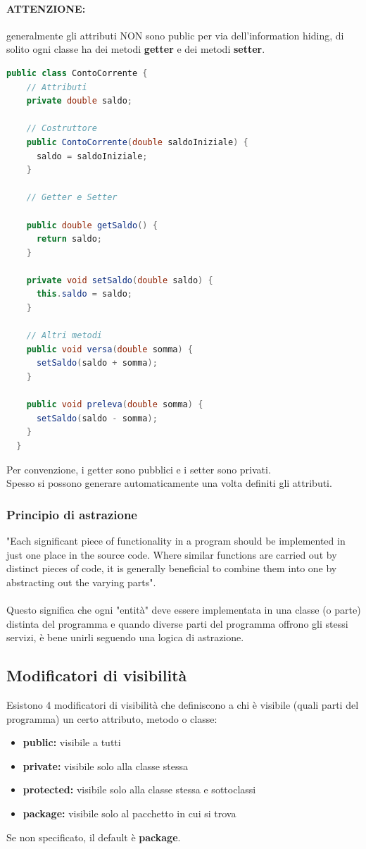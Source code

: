\documentclass[12pt,a4paper]{article}
\begin{document}
\paragraph{ATTENZIONE:} generalmente gli attributi NON sono public per via dell'information hiding, di solito ogni classe ha dei metodi \textbf{getter} e dei metodi \textbf{setter}.
\begin{lstlisting}[language=Java]
  public class ContoCorrente {
    // Attributi
    private double saldo;

    // Costruttore
    public ContoCorrente(double saldoIniziale) {
      saldo = saldoIniziale;
    }

    // Getter e Setter 

    public double getSaldo() {
      return saldo;
    }

    private void setSaldo(double saldo) {
      this.saldo = saldo;
    }

    // Altri metodi
    public void versa(double somma) {
      setSaldo(saldo + somma);
    }

    public void preleva(double somma) {
      setSaldo(saldo - somma);
    }
  }
\end{lstlisting}
Per convenzione, i getter sono pubblici e i setter sono privati.\\
Spesso si possono generare automaticamente una volta definiti gli attributi.
\subsubsection{Principio di astrazione} 
"Each significant piece of
functionality in a program should be implemented in just one
place in the source code. Where similar functions are carried
out by distinct pieces of code, it is generally beneficial to
combine them into one by abstracting out the varying parts".\\\\
Questo significa che ogni "entità" deve essere implementata in una classe (o parte) distinta del programma e quando diverse parti del programma offrono gli stessi servizi, è bene unirli seguendo una logica di astrazione.
\subsection{Modificatori di visibilità}
Esistono 4 modificatori di visibilità che definiscono a chi è visibile (quali parti del programma) un certo attributo, metodo o classe:
\begin{itemize}
  \item \textbf{public:} visibile a tutti
  \item \textbf{private:} visibile solo alla classe stessa
  \item \textbf{protected:} visibile solo alla classe stessa e sottoclassi
  \item \textbf{package:} visibile solo al pacchetto in cui si trova
\end{itemize}
Se non specificato, il default è \textbf{package}.
\end{document}
